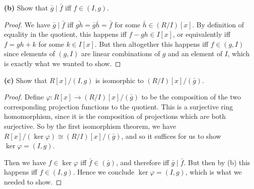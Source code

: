 \documentclass[11pt]{article}
\begin{document}
\textbf{(b)} Show that $\bar g \mid \bar f$ iff $f \in (I,g)$.

\begin{proof}
  We have $\bar g \mid \bar f$ iff $\bar{gh} = \bar g \bar h = \bar f$ for some $\bar h \in (R/I)[x]$.
  By definition of equality in the quotient, this happens iff $f - gh \in I[x]$, or equivalently iff $f = gh + k$ for some $k \in I[x]$.
  But then altogether this happens iff $f \in (g, I)$ since elements of $(g,I)$ are linear combinations of $g$ and an element of $I$, which is exactly what we wanted to show.
\end{proof}

\textbf{(c)} Show that $R[x]/(I,g)$ is isomorphic to $(R/I)[x]/(\bar g)$.

\begin{proof}
  Define $\varphi : R[x] \rightarrow (R/I)[x]/(\bar g)$ to be the composition of the two corresponding projection functions to the quotient.
  This is a surjective ring homomorphism, since it is the composition of projections which are both surjective.
  So by the first isomorphism theorem, we have $R[x]/(\ker \varphi) \cong (R/I)[x]/(\bar g)$, and so it suffices for us to show $\ker \varphi = (I,g)$.

  Then we have $f \in \ker \varphi$ iff $\bar f \in (\bar g)$, and therefore iff $\bar g \mid \bar f$. But then by (b) this happens iff $f \in (I,g)$.
  Hence we conclude $\ker \varphi = (I, g)$, which is what we needed to show.
\end{proof}
\end{document}
